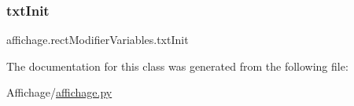 \mbox{\label{classaffichage_1_1rect_modifier_variables_abf231c24af86a4b80c5ccb79d441189b}} 
\subsubsection{\texorpdfstring{txt\+Init}{txtInit}}
{\footnotesize\ttfamily affichage.\+rect\+Modifier\+Variables.\+txt\+Init}



The documentation for this class was generated from the following file\+:\begin{DoxyCompactItemize}
\item 
Affichage/\hyperlink{affichage_8py}{affichage.\+py}\end{DoxyCompactItemize}
